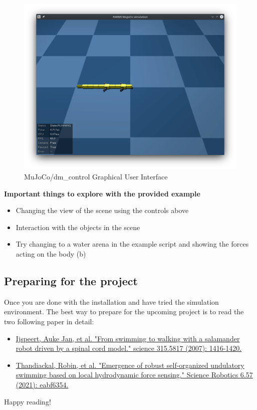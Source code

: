 \documentclass{cmc}
\begin{document}
\begin{figure}[H]
  \centering \includegraphics[width=\textwidth]{figures/mujoco-gui}
  \caption{MuJoCo/dm\_control Graphical User Interface}
  \label{fig:mujoco-gui}
\end{figure}

\textbf{Important things to explore with the provided example}
\begin{itemize}
\item Changing the view of the scene using the controls above
\item Interaction with the objects in the scene
\item Try changing to a water arena in the example script and showing the forces
  acting on the body (b)
\end{itemize}

\subsection*{Preparing for the project}

Once you are done with the installation and have tried the simulation
environment. The best way to prepare for the upcoming project is to read the two
following paper in detail:

\begin{itemize}
\item \href{https://www.science.org/doi/10.1126/science.1138353}{Ijspeert, Auke Jan, et al. "From swimming to walking with a salamander robot driven by a spinal cord model." science 315.5817 (2007): 1416-1420.}
\item \href{https://www.science.org/doi/10.1126/scirobotics.abf6354}{Thandiackal, Robin, et al. "Emergence of robust self-organized undulatory swimming based on local hydrodynamic force sensing." Science Robotics 6.57 (2021): eabf6354.}
\end{itemize}

\begin{center}
  Happy reading!
\end{center}
\end{document}
